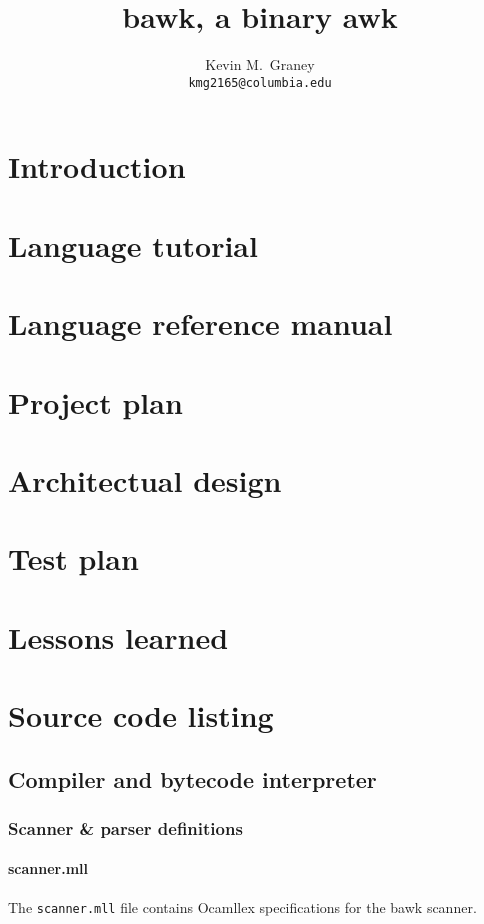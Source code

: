 \documentclass[letterpaper,11pt]{report}
\title{bawk, a binary awk}
\author{
	Kevin M.\ Graney\\
	\texttt{kmg2165@columbia.edu}
}
\begin{document}
\maketitle
\tableofcontents
\lstlistoflistings

\chapter{Introduction}


\chapter{Language tutorial}
\chapter{Language reference manual}


\chapter{Project plan}
\chapter{Architectual design}
\chapter{Test plan}
\chapter{Lessons learned}


\chapter{Source code listing}
\lstset{language=Caml,defaultdialect=[Objective]Caml}

\section{Compiler and bytecode interpreter}
\subsection{Scanner \& parser definitions}
\subsubsection{scanner.mll}
The \texttt{scanner.mll} file contains Ocamllex specifications for the bawk scanner.

\end{document}
